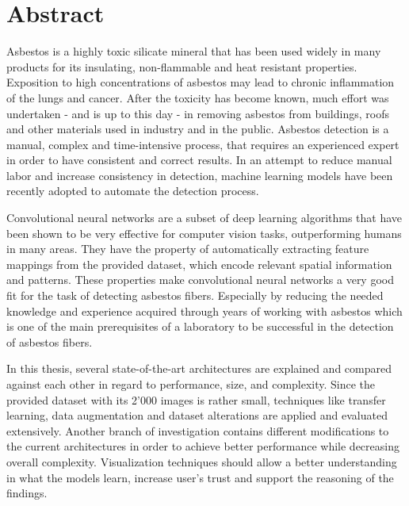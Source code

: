\documentclass[11pt,a4paper,twoside,hidelinks,openright]{rvsmaster}
\begin{document}
\begin{titlepage}
\begin{center}
  \end{center}

\end{titlepage}


\thispagestyle{empty}
\mbox{}

\newpage

\chapter*{Abstract}

Asbestos is a highly toxic silicate mineral that has been used widely in many products for its insulating, non-flammable and heat resistant properties. Exposition to high concentrations of asbestos may lead to chronic inflammation of the lungs and cancer. After the toxicity has become known, much effort was undertaken - and is up to this day - in removing asbestos from buildings, roofs and other materials used in industry and in the public. Asbestos detection is a manual, complex and time-intensive process, that requires an experienced expert in order to have consistent and correct results. In an attempt to reduce manual labor and increase consistency in detection, machine learning models have been recently adopted to automate the detection process.

\vspace{3mm} %

Convolutional neural networks are a subset of deep learning algorithms that have been shown to be very effective for computer vision tasks, outperforming humans in many areas. They have the property of automatically extracting feature mappings from the provided dataset, which encode relevant spatial information and patterns. These properties make convolutional neural networks a very good fit for the task of detecting asbestos fibers. Especially by reducing the needed knowledge and experience acquired through years of working with asbestos which is one of the main prerequisites of a laboratory to be successful in the detection of asbestos fibers.

\vspace{3mm} %

In this thesis, several state-of-the-art architectures are explained and compared against each other in regard to performance, size, and complexity. Since the provided dataset with its 2'000 images is rather small, techniques like transfer learning, data augmentation and dataset alterations are applied and evaluated extensively. Another branch of investigation contains different modifications to the current architectures in order to achieve better performance while decreasing overall complexity. Visualization techniques should allow a better understanding in what the models learn, increase user's trust and support the reasoning of the findings.
\end{document}
